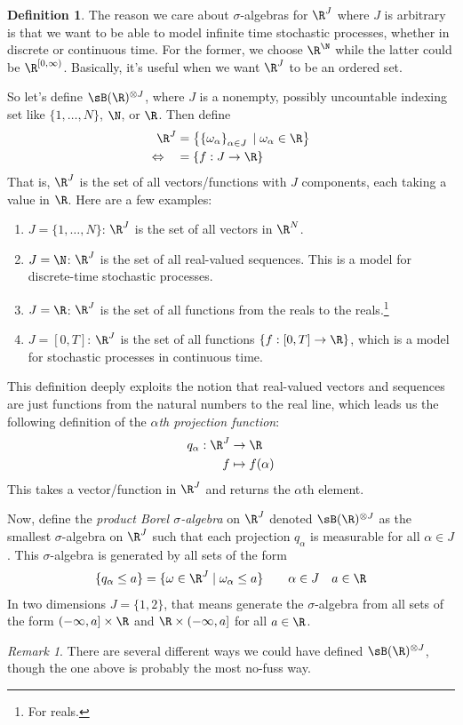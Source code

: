 \documentclass[12pt]{article}
\theoremstyle{plain}
\theoremstyle{definition}
\newtheorem{defn}[thm]{Definition}
\theoremstyle{remark}
\newtheorem*{rmk}{Remark}
\newcommand{\ra}{\rightarrow}
\begin{document}
\begin{defn}
The reason we care about $\sigma$-algebras for $\R^J$ where $J$ is
arbitrary is that we want to be able to model infinite time stochastic
processes, whether in discrete or continuous time. For the former, we
choose $\R^\N$ while the latter could be $\R^{[0,\infty)}$. Basically,
it's useful when we want $\R^J$ to be an ordered set.

So let's define $\sB(\R)^{\otimes J}$, where $J$ is a nonempty, possibly
uncountable indexing set like $\{1,\ldots,N\}$, $\N$, or $\R$. Then
define
\begin{align*}
  \R^J &=
  \left\{
    \left\{ \omega_\alpha \right\}_{\alpha\in J}
    \; | \;
    \omega_\alpha \in \R
  \right\} \\
  \Leftrightarrow\quad
  &=
  \left\{
    f: J \ra \R
  \right\}
\end{align*}
That is, $\R^J$ is the set of all vectors/functions with $J$ components,
each taking a value in $\R$. Here are a few examples:
\begin{enumerate}
  \item $J=\{1,\ldots,N\}$: $\R^J$ is the set of all vectors in $\R^N$.
  \item $J=\N$: $\R^J$ is the set of all real-valued sequences. This is
    a model for discrete-time stochastic processes.
  \item $J=\R$: $\R^J$ is the set of all functions from the reals to the
    reals.\footnote{For reals.}
  \item $J=[0,T]$: $\R^J$ is the set of all functions
    $\{f:[0,T]\ra\R\}$, which is a model for stochastic processes in
    continuous time.
\end{enumerate}
This definition deeply exploits the notion that real-valued vectors and
sequences are just functions from the natural numbers to the real line,
which leads us the following definition of the
\emph{$\alpha$th projection function}:
\begin{align*}
  q_\alpha: \R^J &\ra \R \\
  f &\mapsto f(\alpha)
\end{align*}
This takes a vector/function in $\R^J$ and returns the $\alpha$th
element.

Now, define the \emph{product Borel $\sigma$-algebra} on $\R^J$ denoted
$\sB(\R)^{\otimes J}$ as the smallest $\sigma$-algebra on $\R^J$ such
that each projection $q_\alpha$ is measurable for all $\alpha\in J$.
This $\sigma$-algebra is generated by all sets of the form
\begin{align*}
  \{q_{\alpha}\leq a\}
  =
  \{\omega \in \R^J \;|\; \omega_\alpha \leq a\}
  \qquad \alpha \in J\quad a \in\R
\end{align*}
In two dimensions $J=\{1,2\}$, that means generate the $\sigma$-algebra
from all sets of the form $(-\infty,a]\times \R$ and $\R \times
(-\infty,a]$ for all $a\in \R$.
\end{defn}
\begin{rmk}
There are several different ways we could have defined
$\sB(\R)^{\otimes J}$, though the one above is probably the most no-fuss
way.
\end{rmk}
\end{document}
